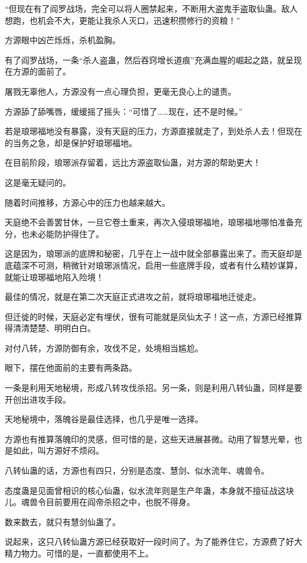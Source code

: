 \begin{this_body}
“但现在有了阎罗战场，完全可以将人圈禁起来，不断用大盗鬼手盗取仙蛊。敌人想跑，也机会不大，更能让我杀人灭口，迅速积攒修行的资粮！”

方源眼中凶芒烁烁，杀机盈胸。

有了阎罗战场，一条“杀人盗蛊，然后吞窍增长道痕”充满血腥的崛起之路，就呈现在方源的面前了。

屠戮无辜他人，方源没有一点心理负担，更毫无良心上的谴责。

方源舔了舔嘴唇，缓缓摇了摇头：“可惜了……现在，还不是时候。”

若是琅琊福地没有暴露，没有天庭的压力，方源直接就走了，到处杀人去！但现在的当务之急，却是保护好琅琊福地。

在目前阶段，琅琊派存留着，远比方源盗取仙蛊，对方源的帮助更大！

这是毫无疑问的。

随着时间推移，方源心中的压力也越来越大。

天庭绝不会善罢甘休，一旦它卷土重来，再次入侵琅琊福地，琅琊福地哪怕准备充分，也未必能防护得住了。

这是因为，琅琊派的底牌和秘密，几乎在上一战中就全部暴露出来了。而天庭却是底蕴深不可测，稍微针对琅琊派情况，启用一些底牌手段，或者有什么精妙谋算，就能让琅琊福地陷入险境！

最佳的情况，就是在第二次天庭正式进攻之前，就将琅琊福地迁徙走。

但迁徙的时候，天庭必定有埋伏，很有可能就是凤仙太子！这一点，方源已经推算得清清楚楚、明明白白。

对付八转，方源防御有余，攻伐不足，处境相当尴尬。

眼下，摆在他面前的主要有两条路。

一条是利用天地秘境，形成八转攻伐杀招。另一条，则是利用八转仙蛊，同样是要开创出进攻手段。

天地秘境中，落魄谷是最佳选择，也几乎是唯一选择。

方源也有推算落魄印的灵感，但可惜的是，这些天进展甚微。动用了智慧光晕，也是如此，叫方源好不烦闷。

八转仙蛊的话，方源也有四只，分别是态度、慧剑、似水流年、魂兽令。

态度蛊是见面曾相识的核心仙蛊，似水流年则是生产年蛊，本身就不擅征战这块儿。魂兽令目前要用在阎帝杀招之中，也脱不得身。

数来数去，就只有慧剑仙蛊了。

说起来，这只八转仙蛊方源已经获取好一段时间了。为了能养住它，方源费了好大精力物力。可惜的是，一直都使用不上。


\end{this_body}

